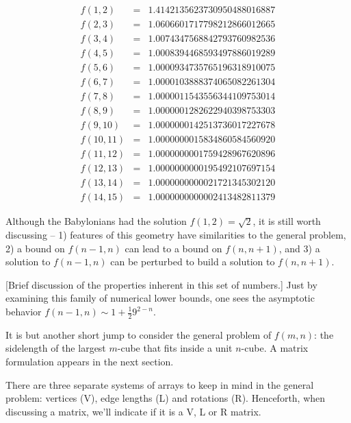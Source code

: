 \documentclass[superscriptaddress,reprint,amsmath,amssymb,aps]{revtex4-1}
\begin{document}
\vspace{-0.10in}
\begin{equation*}
  \begin{matrix}
    f( 1, 2) & = & 1.4142135623730950488016887 \\
    f( 2, 3) & = & 1.0606601717798212866012665 \\
    f( 3, 4) & = & 1.0074347568842793760982536 \\
    f( 4, 5) & = & 1.0008394468593497886019289 \\
    f( 5, 6) & = & 1.0000934735765196318910075 \\
    f( 6, 7) & = & 1.0000103888374065082261304 \\
    f( 7, 8) & = & 1.0000011543556344109753014 \\
    f( 8, 9) & = & 1.0000001282622940398753303 \\
    f( 9,10) & = & 1.0000000142513736017227678 \\
    f(10,11) & = & 1.0000000015834860584560920 \\
    f(11,12) & = & 1.0000000001759428967620896 \\
    f(12,13) & = & 1.0000000000195492107697154 \\
    f(13,14) & = & 1.0000000000021721345302120 \\
    f(14,15) & = & 1.0000000000002413482811379
  \end{matrix}
\end{equation*}

\noindent Although the Babylonians had the solution $f(1,2)=\sqrt{2}$, it is still worth discussing – 1) features of this geometry have similarities to the general problem, 2) a bound on $f(n-1,n)$ can lead to a bound on $f(n,n+1)$, and 3) a solution to $f(n-1,n)$ can be perturbed to build a solution to $f(n,n+1)$.

[Brief discussion of the properties inherent in this set of numbers.]  Just by examining this family of numerical lower bounds, one sees the asymptotic behavior $f(n-1,n) \sim 1+\frac{1}{2} 9^{2-n}$.

\noindent It is but another short jump to consider the general problem of $f(m,n)$: the sidelength of the largest $m$-cube that fits inside a unit $n$-cube.  A matrix formulation appears in the next section.


\vspace{.15in}

There are three separate systems of arrays to keep in mind in the general problem: vertices (V), edge lengths (L) and rotations (R). Henceforth, when discussing a matrix, we'll indicate if it is a V, L or R matrix.
\end{document}
